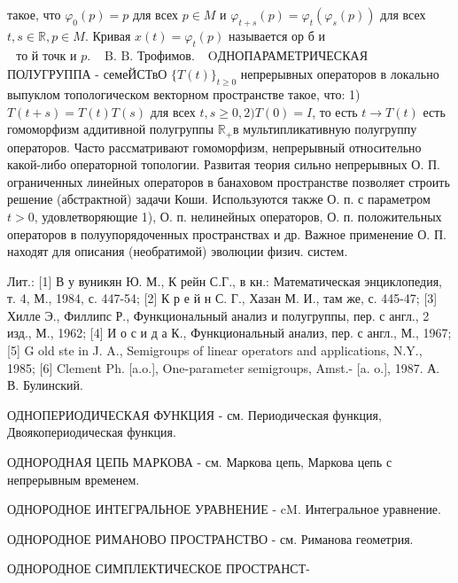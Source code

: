 \documentclass[10pt]{article}
\begin{document}
такое, что $\varphi_{0}(p)=p$ для всех $p \in M$ и $\varphi_{t+s}(p)=\varphi_{t}\left(\varphi_{s}(p)\right)$ для всех $t, s \in \mathbb{R}, p \in M$. Кривая $x(t)=\varphi_{t}(p)$ называется ор $б$ и $\begin{array}{ll}\text { то й точк и } p . & \text { B. B. Трофимов. }\end{array}$ OДНОПАРАМЕТРИЧЕСКАЯ ПОЛУГРУППА - семеЙСТвО $\{T(t)\}_{t \geqslant 0}$ непрерывных операторов в локально выпуклом топологическом векторном пространстве такое, что: 1) $T(t+s)=T(t) T(s)$ для всех $t, s \geqslant 0,2) T(0)=I$, то есть $t \rightarrow T(t)$ есть гомоморфизм аддитивной полугруппы $\mathbb{R}_{+}$в мультипликативную полугруппу операторов. Часто рассматривают гомоморфизм, непрерывный относительно какой-либо операторной топологии. Развитая теория сильно непрерывных О. П. ограниченных линейных операторов в банаховом пространстве позволяет строить решение (абстрактной) задачи Коши. Используются также О. п. с параметром $t>0$, удовлетворяющие 1), О. п. нелинейных операторов, О. п. положительных операторов в полуупорядоченных пространствах и др. Важное применение О. П. находят для описания (необратимой) эволюции физич. систем.



Лит.: [1] В у вуникян Ю. М., К рейн С.Г., в кн.: Математическая энциклопедия, т. 4, М., 1984, с. 447-54; [2] К р е й н С. Г., Хазан М. И., там же, с. 445-47; [3] Хилле Э., Филлипс Р., Функциональный анализ и полугруппы, пер. с англ., 2 изд., М., 1962; [4] И о с и д а К., Функциональный анализ, пер. с англ., М., 1967; [5] G old ste in J. A., Semigroups of linear operators and applications, N.Y., 1985; [6] Clement Ph. [a.o.], One-parameter semigroups, Amst.- [a. o.], 1987. А. В. Булинский.



ОДНОПЕРИОДИЧЕСКАЯ ФУНКЦИЯ - см. Периодическая функция, Двоякопериодическая функция.



ОДНОРОДНАЯ ЦЕПЬ МАРКОВА - см. Маркова цепь, Маркова цепь с непрерывным временем.



ОДНОРОДНОЕ ИНТЕГРАЛЬНОЕ УРАВНЕНИЕ - $\mathrm{cM}$. Интегральное уравнение.



ОДНОРОДНОЕ РИМАНОВО ПРОСТРАНСТВО - см. Риманова геометрия.



ОДНОРОДНОЕ СИМПЛЕКТИЧЕСКОЕ ПРОСТРАНСТ-
\end{document}
